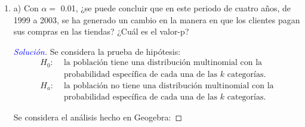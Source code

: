 \documentclass[a4paper,12pt]{article}
\newenvironment{solution}
  {\renewcommand\qedsymbol{$\square$}\begin{proof}[\textcolor{blue}{Solución}]}
  {\end{proof}}
\begin{document}
\begin{enumerate}
    \item a) Con $\alpha=$ 0.01, ¿se puede concluir que en este periodo de cuatro años, de 1999 a 2003, se ha generado un cambio en la manera en que los clientes pagan sus compras en las tiendas? ¿Cuál es el valor-p?
    \begin{solution} Se considera la prueba de hipótesis: 
    \begin{align*}
        H_0: & 
             \text{ la población tiene una distribución multinomial con la}\\
            & \text{ probabilidad específica de cada una de las $k$ categorías.}\\
        H_a: &  
             \text{ la población no tiene una distribución multinomial con la}\\
         &\text{ probabilidad específica de cada una de las $k$ categorías.}
    \end{align*}
    
    Se considera el análisis hecho en Geogebra:
    

\end{solution}
\end{enumerate}
\end{document}
